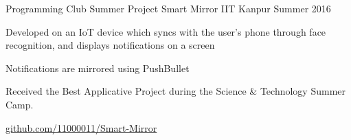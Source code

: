\begin{cventries}
  \cventry
  {Programming Club Summer Project} %
  {Smart Mirror} %
  {IIT Kanpur} %
  {Summer 2016} %
  {
    \begin{cvitems} %
    \item {Developed on an IoT device which syncs with the user's phone through face
        recognition, and displays notifications on a screen }
    \item {Notifications are mirrored using PushBullet}
    \item {Received the Best Applicative Project during the Science \&
        Technology Summer Camp.}
    \item \href{https://github.com/11000011/Smart-Mirror}{github.com/11000011/Smart-Mirror}
    \end{cvitems}
  }

\end{cventries}
